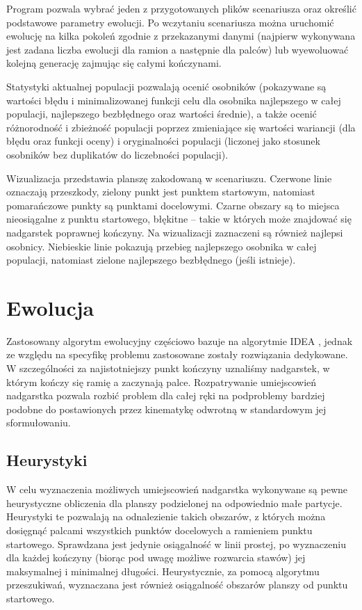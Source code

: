 \documentclass[11pt, leqno]{article}
\begin{document}
Program pozwala wybrać jeden z przygotowanych plików scenariusza oraz określić podstawowe parametry ewolucji. Po wczytaniu scenariusza można uruchomić ewolucję na kilka pokoleń zgodnie z przekazanymi danymi (najpierw wykonywana jest zadana liczba ewolucji dla ramion a następnie dla palców) lub wyewoluować kolejną generację zajmując się całymi kończynami.

Statystyki aktualnej populacji pozwalają ocenić osobników (pokazywane są wartości błędu i minimalizowanej funkcji celu dla osobnika najlepszego w całej populacji, najlepszego bezbłędnego oraz wartości średnie), a także ocenić różnorodność i zbieżność populacji poprzez zmieniające się wartości wariancji (dla błędu oraz funkcji oceny) i oryginalności populacji (liczonej jako stosunek osobników bez duplikatów do liczebności populacji).

Wizualizacja przedstawia planszę zakodowaną w scenariuszu. Czerwone linie oznaczają przeszkody, zielony punkt jest punktem startowym, natomiast pomarańczowe punkty są punktami docelowymi. Czarne obszary są to miejsca nieosiągalne z punktu startowego, błękitne -- takie w których może znajdować się nadgarstek poprawnej kończyny. Na wizualizacji zaznaczeni są również najlepsi osobnicy. Niebieskie linie pokazują przebieg najlepszego osobnika w całej populacji, natomiast zielone najlepszego bezbłędnego (jeśli istnieje).

\section{Ewolucja}
Zastosowany algorytm ewolucyjny częściowo bazuje na algorytmie IDEA \cite{PFI}, jednak ze względu na specyfikę problemu zastosowane zostały rozwiązania dedykowane. W szczególności za najistotniejszy punkt kończyny uznaliśmy nadgarstek, w którym kończy się ramię a zaczynają palce. Rozpatrywanie umiejscowień nadgarstka pozwala rozbić problem dla całej ręki na podproblemy bardziej podobne do postawionych przez kinematykę odwrotną w standardowym jej sformułowaniu. 

\subsection{Heurystyki}
W celu wyznaczenia możliwych umiejscowień nadgarstka wykonywane są pewne heurystyczne obliczenia dla planszy podzielonej na odpowiednio małe partycje. Heurystyki te pozwalają na odnalezienie takich obszarów, z których można dosięgnąć palcami wszystkich punktów docelowych a ramieniem punktu startowego. Sprawdzana jest jedynie osiągalność w linii prostej, po wyznaczeniu dla każdej kończyny (biorąc pod uwagę możliwe rozwarcia stawów) jej maksymalnej i minimalnej długości. Heurystycznie, za pomocą algorytmu przeszukiwań, wyznaczana jest również osiągalność obszarów planszy od punktu startowego.
\end{document}
